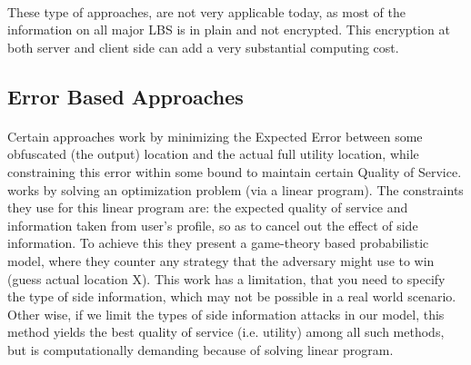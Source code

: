 \documentclass[12pt]{report}
\theoremstyle{named}
\begin{document}
\paragraph{}
These type of approaches, are not very applicable today, as most of the information on all major LBS is in plain and not encrypted. This encryption at both server and client side can add a very substantial computing cost.



\subsection{Error Based Approaches}
\paragraph{}
Certain approaches work by minimizing the Expected Error between some obfuscated (the output) location and the actual full utility location, while constraining this error within some bound to maintain certain Quality of Service. \cite{shokri2012protecting} works by solving an optimization problem (via a linear program). The constraints they use for this linear program are: the expected quality of service and information taken from user's profile, so as to cancel out the effect of side information. To achieve this they present a game-theory based probabilistic model, where they counter any strategy that the adversary might use to win (guess actual location X). This work has a limitation, that you need to specify the type of side information, which may not be possible in a real world scenario. Other wise, if we limit the types of side information attacks in our model, this method yields the best quality of service (i.e. utility) among all such methods, but is computationally demanding because of solving linear program.
\end{document}

